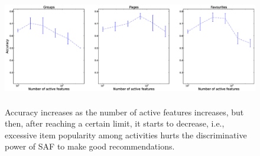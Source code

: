 \begin{figure}[tbh!]
\centering
\includegraphics[width=180mm, height=50mm]{data/plots/new/accuracyVsactiveFeatures.eps}
\vspace{-6mm}
\caption{Accuracy increases as the number of active features increases, but then, after reaching a certain limit, it starts to decrease, i.e., excessive item popularity among activities hurts the discriminative power of SAF to make good recommendations.}
\label{fig:AccuracyVsactiveFeats}
\end{figure}
